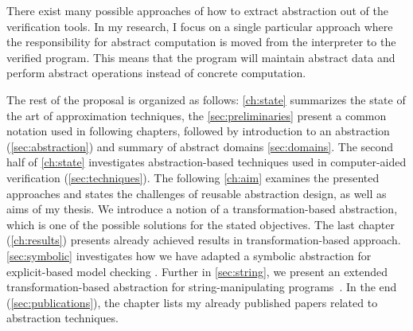 There exist many possible approaches of how to extract abstraction out of the
verification tools. In my research, I focus on a single particular approach
where the responsibility for abstract computation is moved from the interpreter
to the verified program. This means that the program will maintain abstract
data and perform abstract operations instead of concrete computation.

The rest of the proposal is organized as follows: \autoref{ch:state} summarizes
the state of the art of approximation techniques, the
\autoref{sec:preliminaries} present a common notation used in following
chapters, followed by introduction to an abstraction
(\autoref{sec:abstraction}) and summary of abstract domains
\autoref{sec:domains}. The second half of \autoref{ch:state} investigates
abstraction-based techniques used in computer-aided verification
(\autoref{sec:techniques}). The following \autoref{ch:aim} examines the
presented approaches and states the challenges of reusable abstraction design,
as well as aims of my thesis. We introduce a notion of a transformation-based
abstraction, which is one of the possible solutions for the stated objectives.
The last chapter (\autoref{ch:results}) presents already achieved results in
transformation-based approach.  \autoref{sec:symbolic} investigates how we have
adapted a symbolic abstraction for explicit-based model checking
\cite{Lauko2019Sym, Lauko2018SymComp}. Further in \autoref{sec:string}, we
pre\-sent an extended transformation-based abstraction for
string-ma\-ni\-pu\-la\-ting programs~\cite{Lauko2019String}.  In the end
(\autoref{sec:publications}), the chapter lists my already published papers
related to abstraction techniques.
